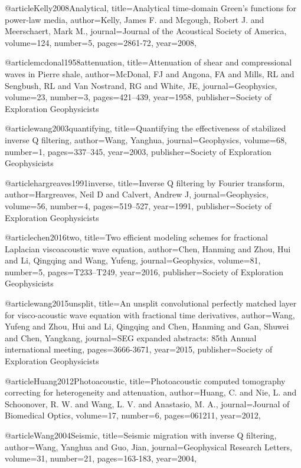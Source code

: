 {@article{Kelly2008Analytical,
  title={Analytical time-domain Green's functions for power-law media},
  author={Kelly, James F. and Mcgough, Robert J. and Meerschaert, Mark M.},
  journal={Journal of the Acoustical Society of America},
  volume={124},
  number={5},
  pages={2861-72},
  year={2008},
}

@article{mcdonal1958attenuation,
  title={Attenuation of shear and compressional waves in Pierre shale},
  author={McDonal, FJ and Angona, FA and Mills, RL and Sengbush, RL and Van Nostrand, RG and White, JE},
  journal={Geophysics},
  volume={23},
  number={3},
  pages={421--439},
  year={1958},
  publisher={Society of Exploration Geophysicists}
}

@article{wang2003quantifying,
  title={Quantifying the effectiveness of stabilized inverse {Q} filtering},
  author={Wang, Yanghua},
  journal={Geophysics},
  volume={68},
  number={1},
  pages={337--345},
  year={2003},
  publisher={Society of Exploration Geophysicists}
}

@article{hargreaves1991inverse,
  title={Inverse {Q} filtering by Fourier transform},
  author={Hargreaves, Neil D and Calvert, Andrew J},
  journal={Geophysics},
  volume={56},
  number={4},
  pages={519--527},
  year={1991},
  publisher={Society of Exploration Geophysicists}
}

@article{chen2016two,
  title={Two efficient modeling schemes for fractional {L}aplacian viscoacoustic wave equation},
  author={Chen, Hanming and Zhou, Hui and Li, Qingqing and Wang, Yufeng},
  journal={Geophysics},
  volume={81},
  number={5},
  pages={T233--T249},
  year={2016},
  publisher={Society of Exploration Geophysicists}
}

@article{wang2015unsplit,
  title={An unsplit convolutional perfectly matched layer for visco-acoustic wave equation with fractional time derivatives},
  author={Wang, Yufeng and Zhou, Hui and Li, Qingqing and Chen, Hanming and Gan, Shuwei and Chen, Yangkang},
  journal={SEG expanded abstracts: 85th Annual international meeting},
  pages={3666-3671},
  year={2015},
  publisher={Society of Exploration Geophysicists}
}

@article{Huang2012Photoacoustic,
  title={Photoacoustic computed tomography correcting for heterogeneity and attenuation},
  author={Huang, C. and Nie, L. and Schoonover, R. W. and Wang, L. V. and Anastasio, M. A.},
  journal={Journal of Biomedical Optics},
  volume={17},
  number={6},
  pages={061211},
  year={2012},
}

@article{Wang2004Seismic,
  title={Seismic migration with inverse {Q} filtering},
  author={Wang, Yanghua and Guo, Jian},
  journal={Geophysical Research Letters},
  volume={31},
  number={21},
  pages={163-183},
  year={2004},
}

}
